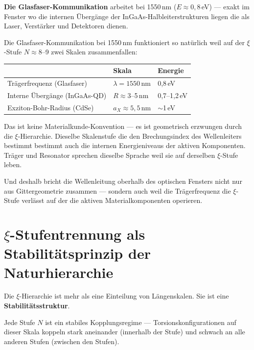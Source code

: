 \textbf{Die Glasfaser-Kommunikation}
arbeitet bei 1550\,nm ($E \approx 0{,}8$\,eV) ---
exakt im Fenster wo die internen Übergänge
der InGaAs-Halbleiterstrukturen liegen
die als Laser, Verstärker und Detektoren dienen.

\begin{keyresult}
Die Glasfaser-Kommunikation bei 1550\,nm funktioniert
so natürlich weil auf der $\xi$-Stufe $N \approx 8$--9
zwei Skalen zusammenfallen:

\begin{center}
\begin{tabular}{lll}
\toprule
& \textbf{Skala} & \textbf{Energie} \\
\midrule
Trägerfrequenz (Glasfaser) & $\lambda = 1550$\,nm & 0{,}8\,eV \\
Interne Übergänge (InGaAs-QD) & $R \approx 3$--5\,nm & 0{,}7--1{,}2\,eV \\
Exziton-Bohr-Radius (CdSe) & $a_X \approx 5{,}5$\,nm & $\sim$1\,eV \\
\bottomrule
\end{tabular}
\end{center}

Das ist keine Materialkunde-Konvention ---
es ist geometrisch erzwungen durch die $\xi$-Hierarchie.
Dieselbe Skalenstufe die den Brechungsindex
des Wellenleiters bestimmt bestimmt auch
die internen Energieniveaus der aktiven Komponenten.
Träger und Resonator sprechen dieselbe Sprache
weil sie auf derselben $\xi$-Stufe leben.

Und deshalb bricht die Wellenleitung oberhalb
des optischen Fensters nicht nur aus Gittergeometrie
zusammen --- sondern auch weil die Trägerfrequenz
die $\xi$-Stufe verlässt auf der die aktiven
Materialkomponenten operieren.
\end{keyresult}

\section{\texorpdfstring{$\xi$}{xi}-Stufentrennung als Stabilitätsprinzip
  der Naturhierarchie}
\label{sec:stufentrennung}

Die $\xi$-Hierarchie ist mehr als eine Einteilung
von Längenskalen. Sie ist eine
\textbf{Stabilitätsstruktur}.

Jede Stufe $N$ ist ein stabiles Kopplungsregime ---
Torsionskonfigurationen auf dieser Skala koppeln
stark aneinander (innerhalb der Stufe)
und schwach an alle anderen Stufen
(zwischen den Stufen).

